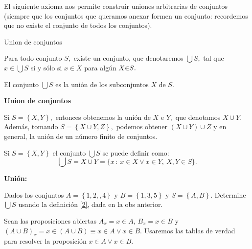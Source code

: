 El siguiente axioma nos permite construir uniones arbitrarias de conjuntos
(siempre que los conjuntos que queramos anexar formen un conjunto:
recordemos que no existe el conjunto de todos los conjuntos).

\begin{axioma}{Union de conjuntos}{}\label{union}

Para todo conjunto $S,$ existe un conjunto, que denotaremos $\bigcup S,$
tal que $x\in\bigcup S$ si y sólo si $x\in X$ para algún $X\text{\ensuremath{\in}\ensuremath{S}.}$

\end{axioma}

\obs  El conjunto $\bigcup S$ es la unión de los subconjuntos $X$
de $S.$

\begin{ejemplo}{\bf Union de conjuntos} 

Si $S=\left\{ X,Y\right\} ,$ entonces obtenemos la unión de $X$
e $Y,$ que denotamos $X\cup Y.$ Además, tomando $S=\left\{ X\cup Y,Z\right\} ,$
podemos obtener $\left(X\cup Y\right)\cup Z$ y en general, la unión
de un número finito de conjuntos.

\end{ejemplo}

\obs Si $S=\left\{ X,Y\right\} $ el conjunto $\bigcup S$ se puede
definir como: 
\begin{equation}
\bigcup S=X\cup Y=\{x\,:\:x\in X\vee x\in Y,\:X,Y\in S\}.\label{2}
\end{equation}

\begin{ejemplo}{\bf Unión:}

Dados los conjuntos $A=\left\{ 1,2,,4\right\} $ y $B=\left\{ 1,3,5\right\} $
y $S=\left\{ A,B\right\} .$ Determine $\bigcup S$ usando la definición
\ref{2}, dada en la obs anterior.

\end{ejemplo}

\solu Sean las proposiciones abiertas $A_{x}=x\in A$, $B_{x}=x\in B$
y $\left(A\cup B\right)_{x}=x\in\left(A\cup B\right)\equiv x\in A\vee x\in B.$
Usaremos las tablas de verdad para resolver la proposición $x\in A\vee x\in B.$

